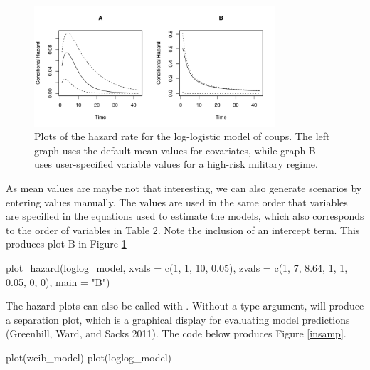 \documentclass[article]{jss}
\begin{document}
\begin{figure}
\begin{center}
\includegraphics[width=0.8\textwidth]{graphics/hazard-ex.pdf}
\caption{Plots of the hazard rate for the log-logistic model of coups. The left graph uses the default mean values for covariates, while graph B uses user-specified variable values for a high-risk military regime.}
\label{hazard-ex}
\end{center}
\end{figure}

As mean values are maybe not that interesting, we can also generate
scenarios by entering values manually. The values are used in the same
order that variables are specified in the equations used to estimate the
models, which also corresponds to the order of variables in Table 2.
Note the inclusion of an intercept term. This produces plot B in Figure
\ref{hazard-ex}

\begin{CodeChunk}
\begin{CodeInput}
plot_hazard(loglog_model, 
     xvals = c(1, 1, 10, 0.05), 
     zvals = c(1, 7, 8.64, 1, 1, 0.05, 0, 0),
     main = "B")
\end{CodeInput}
\end{CodeChunk}

The hazard plots can also be called with
. Without a type argument,
 will produce a separation plot, which is a graphical
display for evaluating model predictions (Greenhill, Ward, and Sacks
2011). The code below produces Figure \ref{insamp}.

\begin{CodeChunk}
\begin{CodeInput}
plot(weib_model)
plot(loglog_model)
\end{CodeInput}
\end{CodeChunk}
\end{document}
